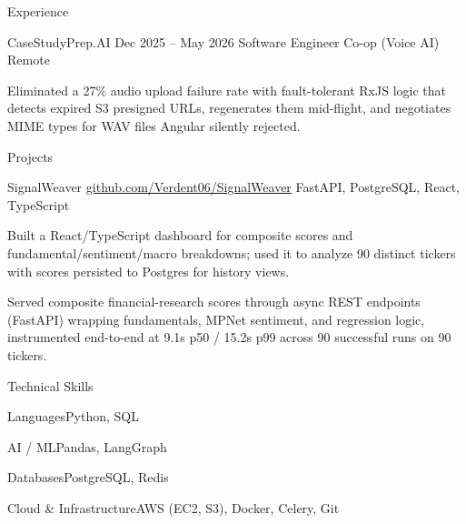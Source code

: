 \documentclass[
	11pt
]{../../../template}
\begin{document}
\begin{rSection}{E}{xperience}
		\begin{rSectionEntry}
			{CaseStudyPrep.AI}
			{Dec 2025 -- May 2026}
			{Software Engineer Co-op (Voice AI)}
			{}
			{Remote}

			\item Eliminated a 27\% audio upload failure rate with fault-tolerant RxJS logic that detects expired S3 presigned URLs, regenerates them mid-flight, and negotiates MIME types for WAV files Angular silently rejected.
		\end{rSectionEntry}
	\end{rSection}

	\begin{rSection}{P}{rojects}
		\begin{rSectionEntry}
			{SignalWeaver}
			{\href{https://github.com/Verdent06/SignalWeaver}{github.com/Verdent06/SignalWeaver}}
			{}
			{FastAPI, PostgreSQL, React, TypeScript}
			{}

			\item Built a React/TypeScript dashboard for composite scores and fundamental/sentiment/macro breakdowns; used it to analyze 90 distinct tickers with scores persisted to Postgres for history views.
			\item Served composite financial-research scores through async REST endpoints (FastAPI) wrapping fundamentals, MPNet sentiment, and regression logic, instrumented end-to-end at 9.1s p50 / 15.2s p99 across 90 successful runs on 90 tickers.
		\end{rSectionEntry}
	\end{rSection}

	\begin{rSection}{T}{echnical Skills}
		\begin{rSet}{Languages}{Python, SQL}
		\end{rSet}
		\begin{rSet}{AI / ML}{Pandas, LangGraph}
		\end{rSet}
		\begin{rSet}{Databases}{PostgreSQL, Redis}
		\end{rSet}
		\begin{rSet}{Cloud \& Infrastructure}{AWS (EC2, S3), Docker, Celery, Git}
		\end{rSet}
	\end{rSection}
\end{document}
